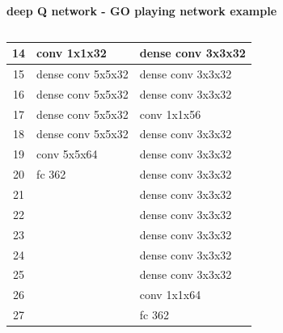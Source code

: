 \documentclass[xcolor=dvipsnames]{beamer}
\begin{document}
\begin{frame}{\bf deep Q network - GO playing network example}
\begin{columns}
\begin{column}{0.8\textwidth}
{\begin{table}[]
\begin{tabular}{|c|l|l|}
    14             & \cellcolor[HTML]{38FFF8}conv 1x1x32       & \cellcolor[HTML]{FD6864}dense conv 3x3x32 \\ \hline
    15             & \cellcolor[HTML]{FD6864}dense conv 5x5x32 & \cellcolor[HTML]{FD6864}dense conv 3x3x32 \\ \hline
    16             & \cellcolor[HTML]{FD6864}dense conv 5x5x32 & \cellcolor[HTML]{FD6864}dense conv 3x3x32 \\ \hline
    17             & \cellcolor[HTML]{FD6864}dense conv 5x5x32 & \cellcolor[HTML]{38FFF8}conv 1x1x56       \\ \hline
    18             & \cellcolor[HTML]{FD6864}dense conv 5x5x32 & \cellcolor[HTML]{FD6864}dense conv 3x3x32 \\ \hline
    19             & \cellcolor[HTML]{38FFF8}conv 5x5x64       & \cellcolor[HTML]{FD6864}dense conv 3x3x32 \\ \hline
    20             & \cellcolor[HTML]{67FD9A}fc 362            & \cellcolor[HTML]{FD6864}dense conv 3x3x32 \\ \hline
    21             &                                           & \cellcolor[HTML]{FD6864}dense conv 3x3x32 \\ \hline
    22             &                                           & \cellcolor[HTML]{FD6864}dense conv 3x3x32 \\ \hline
    23             &                                           & \cellcolor[HTML]{FD6864}dense conv 3x3x32 \\ \hline
    24             &                                           & \cellcolor[HTML]{FD6864}dense conv 3x3x32 \\ \hline
    25             &                                           & \cellcolor[HTML]{FD6864}dense conv 3x3x32 \\ \hline
    26             &                                           & \cellcolor[HTML]{38FFF8}conv 1x1x64       \\ \hline
    27             &                                           & \cellcolor[HTML]{67FD9A}fc 362            \\ \hline
    \end{tabular}
    \end{table}
    }

    \end{column}
\end{columns}


\end{frame}
\end{document}
